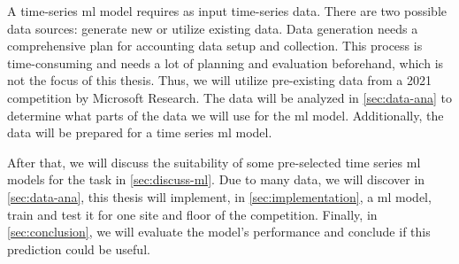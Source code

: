 A time-series \ac{ml} model requires as input time-series data.
There are two possible data sources: generate new or utilize existing data. 
Data generation needs a comprehensive plan for accounting data setup and collection.
This process is time-consuming and needs a lot of planning and evaluation beforehand, which is not the focus of this thesis.
Thus, we will utilize pre-existing data from a 2021 competition by Microsoft Research\cite{IndoorLocationNavigation}.
The data will be analyzed in \cref{sec:data-ana} to determine what parts of the data we will use for the \ac{ml} model.
Additionally, the data will be prepared for a time series \ac{ml} model.

After that, we will discuss the suitability of some pre-selected time series \ac{ml} models for the task in \cref{sec:discuss-ml}. 
Due to many data, we will discover in \cref{sec:data-ana}, this thesis will implement, in \cref{sec:implementation}, a \ac{ml} model, train and test it for one site and floor of the competition.
Finally, in \cref{sec:conclusion}, we will evaluate the model's performance and conclude if this prediction could be useful.

